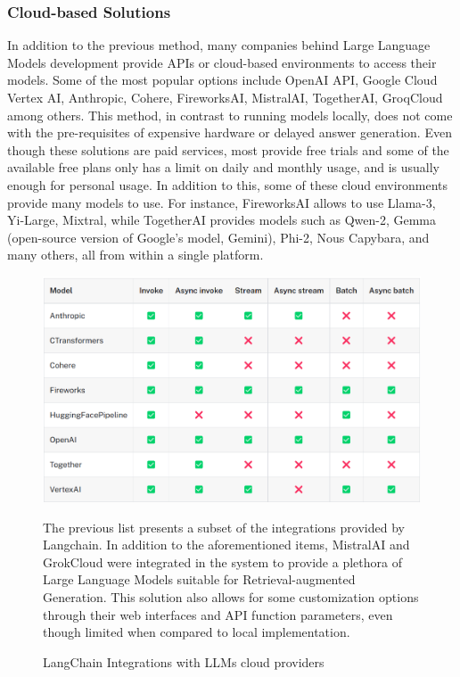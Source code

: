 \subsubsection{Cloud-based Solutions}
In addition to the previous method, many companies behind Large Language Models development provide APIs or cloud-based environments to access their models. Some of the most popular options include OpenAI API, Google Cloud Vertex AI, Anthropic, Cohere, FireworksAI, MistralAI, TogetherAI, GroqCloud among others.\newline
This method, in contrast to running models locally, does not come with the pre-requisites of expensive hardware or delayed answer generation. Even though these solutions are paid services, most provide free trials and some of the available free plans only has a limit on daily and monthly usage, and is usually enough for personal usage. In addition to this, some of these cloud environments provide many models to use. For instance, FireworksAI allows to use Llama-3, Yi-Large, Mixtral, while TogetherAI provides models such as Qwen-2, Gemma (open-source version of Google's model, Gemini), Phi-2, Nous Capybara, and many others, all from within a single platform.
\begin{figure}[H]
    \centering
    \includegraphics[width=\linewidth]{./figures/langchain-llm-integrations.png}
    \caption{LangChain Integrations with LLMs cloud providers \cite{langchainllmintegrations}}
    \begin{flushleft}
        \small The previous list presents a subset of the integrations provided by Langchain. In addition to the aforementioned items, MistralAI and GrokCloud were integrated in the system to provide a plethora of Large Language Models suitable for Retrieval-augmented Generation. This solution also allows for some customization options through their web interfaces and API function parameters, even though limited when compared to local implementation.
    \end{flushleft}
\end{figure}
